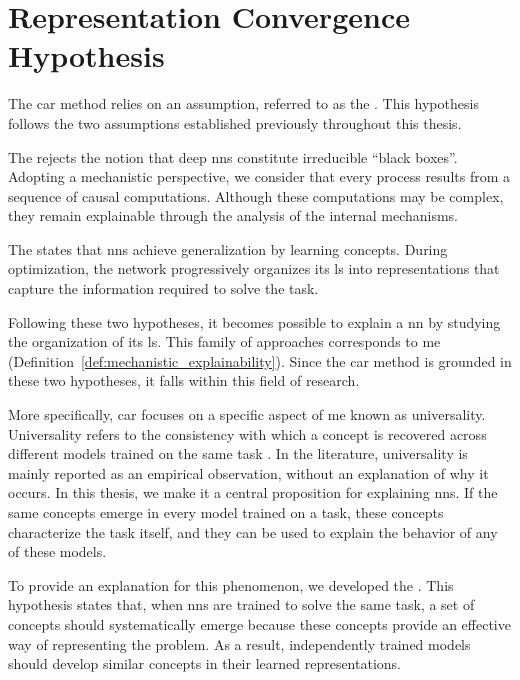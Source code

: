 \section{Representation Convergence Hypothesis}
\label{sec:clustering_agent_representations_representation_convergence_hypothesis}

The \gls{car} method relies on an assumption, referred to as the \RepresentationConvergenceHypothesisName.
This hypothesis follows the two assumptions established previously throughout this thesis.

The \MechanisticHypothesisName rejects the notion that deep \glspl{nn} constitute irreducible \enquote{black boxes}.
Adopting a mechanistic perspective, we consider that every process results from a sequence of causal computations.
Although these computations may be complex, they remain explainable through the analysis of the internal mechanisms.

The \ConceptHypothesisName states that \glspl{nn} achieve generalization by learning concepts.
During optimization, the network progressively organizes its \gls{ls} into representations that capture the information required to solve the task.

Following these two hypotheses, it becomes possible to explain a \gls{nn} by studying the organization of its \gls{ls}.
This family of approaches corresponds to \gls{me} (Definition~\ref{def:mechanistic_explainability}).
Since the \gls{car} method is grounded in these two hypotheses, it falls within this field of research.

More specifically, \gls{car} focuses on a specific aspect of \gls{me} known as universality.
Universality refers to the consistency with which a concept is recovered across different models trained on the same task \parencite{templeton2024scaling}.
In the literature, universality is mainly reported as an empirical observation, without an explanation of why it occurs.
In this thesis, we make it a central proposition for explaining \glspl{nn}.
If the same concepts emerge in every model trained on a task, these concepts characterize the task itself, and they can be used to explain the behavior of any of these models.

To provide an explanation for this phenomenon, we developed the \RepresentationConvergenceHypothesisName.
This hypothesis states that, when \glspl{nn} are trained to solve the same task, a set of concepts should systematically emerge because these concepts provide an effective way of representing the problem.
As a result, independently trained models should develop similar concepts in their learned representations.

